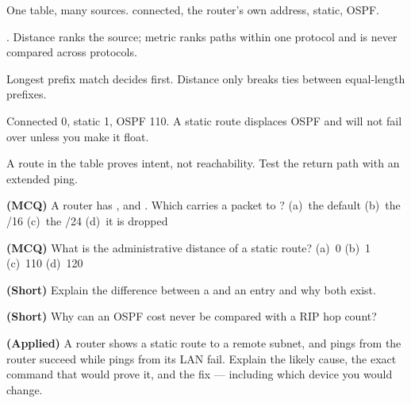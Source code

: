 \begin{chaptersummary}
\begin{tight}
  \item One table, many sources.  connected,  the router's own
        address,  static,  OSPF.
  \item {}. Distance ranks the source; metric ranks paths
        within one protocol and is never compared across protocols.
  \item Longest prefix match decides first. Distance only breaks ties between
        equal-length prefixes.
  \item Connected 0, static 1, OSPF 110. A static route displaces OSPF and will
        not fail over unless you make it float.
  \item A route in the table proves intent, not reachability. Test the return
        path with an extended ping.
\end{tight}
\end{chaptersummary}

\begin{reviewq}
  \item \textbf{(MCQ)} A router has ,  and
        . Which carries a packet to ?
        (a)~the default (b)~the /16 (c)~the /24 (d)~it is dropped
  \item \textbf{(MCQ)} What is the administrative distance of a static route?
        (a)~0 (b)~1 (c)~110 (d)~120
  \item \textbf{(Short)} Explain the difference between a  and an 
        entry and why both exist.
  \item \textbf{(Short)} Why can an OSPF cost never be compared with a RIP hop
        count?
  \item \textbf{(Applied)} A router shows a static route to a remote subnet, and
        pings from the router succeed while pings from its LAN fail. Explain the
        likely cause, the exact command that would prove it, and the fix ---
        including which device you would change.
\end{reviewq}

